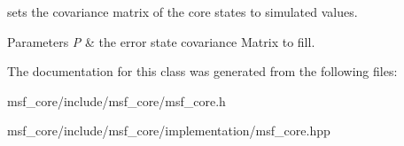 sets the covariance matrix of the core states to simulated values. 


\begin{DoxyParams}{Parameters}
{\em P} & the error state covariance Matrix to fill. \\
\hline
\end{DoxyParams}


The documentation for this class was generated from the following files\-:\begin{DoxyCompactItemize}
\item 
msf\-\_\-core/include/msf\-\_\-core/msf\-\_\-core.\-h\item 
msf\-\_\-core/include/msf\-\_\-core/implementation/msf\-\_\-core.\-hpp\end{DoxyCompactItemize}
